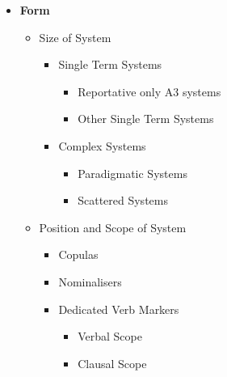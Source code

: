 \begin{figure}\label{f:Description:SummaryOverview}
        \begin{multicols}{2}
        \begin{itemize}
                \item[] \textbf{Form}
                \begin{itemize}
                        \item[] Size of System
                        \begin{itemize}
                                \item Single Term Systems
                                \begin{itemize}
                                        \item Reportative only A3 systems
                                        \item Other Single Term Systems
                                \end{itemize}
                                \item Complex Systems
                                \begin{itemize}
                                        \item Paradigmatic Systems
                                        \item Scattered Systems
                                \end{itemize}
                        \end{itemize}
                        \item[] Position and Scope of System
                        \begin{itemize}
                                \item Copulas
                                \item Nominalisers
                                \item Dedicated Verb Markers
                                \begin{itemize}
                                        \item Verbal Scope
                                        \item Clausal Scope
                                \end{itemize}
                        \end{itemize}
                \end{itemize}
        \end{itemize}

\end{multicols}
\end{figure}
